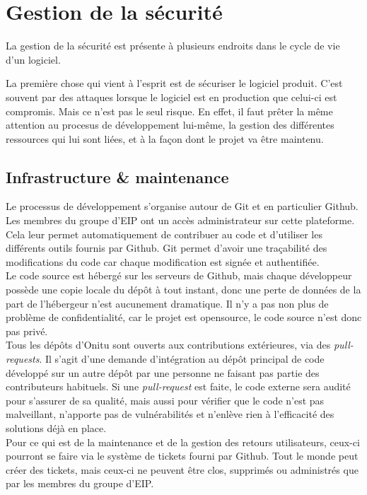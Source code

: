\section{Gestion de la sécurité}

La gestion de la sécurité est présente à plusieurs endroits dans le cycle de vie d'un logiciel. 

La première chose qui vient à l'esprit est de sécuriser le logiciel produit. C'est souvent par des attaques lorsque le logiciel est en production que celui-ci est compromis. Mais ce n'est pas le seul risque. En effet, il faut prêter la même attention au procesus de développement lui-même, la gestion des différentes ressources qui lui sont liées, et à la façon dont le projet va être maintenu.

\subsection{Infrastructure \& maintenance}

Le processus de développement s'organise autour de Git et en particulier Github. Les membres du groupe d'EIP ont un accès administrateur sur cette plateforme. Cela leur permet automatiquement de contribuer au code et d'utiliser les différents outils fournis par Github. Git permet d'avoir une traçabilité des modifications du code car chaque modification est signée et authentifiée.\\

Le code source est hébergé sur les serveurs de Github, mais chaque développeur possède une copie locale du dépôt à tout instant, donc une perte de données de la part de l'hébergeur n'est aucunement dramatique. Il n'y a pas non plus de problème de confidentialité, car le projet est opensource, le code source n'est donc pas privé.\\

Tous les dépôts d'Onitu sont ouverts aux contributions extérieures, via des \textit{pull-requests}. Il s'agit d'une demande d'intégration au dépôt principal de code développé sur un autre dépôt par une personne ne faisant pas partie des contributeurs habituels. Si une \textit{pull-request} est faite, le code externe sera audité pour s'assurer de sa qualité, mais aussi pour vérifier que le code n'est pas malveillant, n'apporte pas de vulnérabilités et n'enlève rien à l'efficacité des solutions déjà en place.\\

Pour ce qui est de la maintenance et de la gestion des retours utilisateurs, ceux-ci pourront se faire via le système de tickets fourni par Github. Tout le monde peut créer des tickets, mais ceux-ci ne peuvent être clos, supprimés ou administrés que par les membres du groupe d'EIP.

